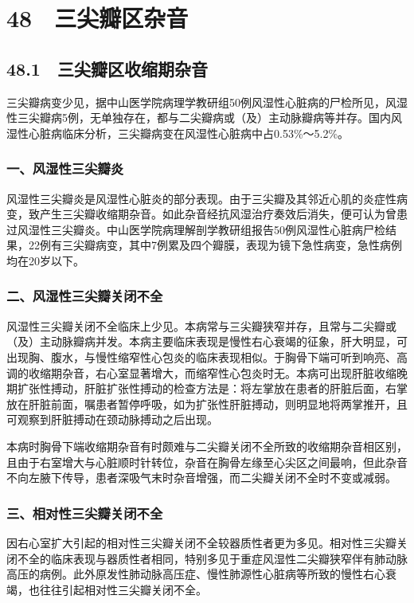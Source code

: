 \section{48　三尖瓣区杂音}

\subsection{48.1　三尖瓣区收缩期杂音}

三尖瓣病变少见，据中山医学院病理学教研组50例风湿性心脏病的尸检所见，风湿性三尖瓣病5例，无单独存在，都与二尖瓣病或（及）主动脉瓣病等并存。国内风湿性心脏病临床分析，三尖瓣病变在风湿性心脏病中占0.53\%～5.2\%。

\subsubsection{一、风湿性三尖瓣炎}

风湿性三尖瓣炎是风湿性心脏炎的部分表现。由于三尖瓣及其邻近心肌的炎症性病变，致产生三尖瓣收缩期杂音。如此杂音经抗风湿治疗奏效后消失，便可认为曾患过风湿性三尖瓣炎。中山医学院病理解剖学教研组报告50例风湿性心脏病尸检结果，22例有三尖瓣病变，其中7例累及四个瓣膜，表现为镜下急性病变，急性病例均在20岁以下。

\subsubsection{二、风湿性三尖瓣关闭不全}

风湿性三尖瓣关闭不全临床上少见。本病常与三尖瓣狭窄并存，且常与二尖瓣或（及）主动脉瓣病并发。本病主要临床表现是慢性右心衰竭的征象，肝大明显，可出现胸、腹水，与慢性缩窄性心包炎的临床表现相似。于胸骨下端可听到响亮、高调的收缩期杂音，右心室显著增大，而缩窄性心包炎时无。本病可出现肝脏收缩晚期扩张性搏动，肝脏扩张性搏动的检查方法是：将左掌放在患者的肝脏后面，右掌放在肝脏前面，嘱患者暂停呼吸，如为扩张性肝脏搏动，则明显地将两掌推开，且可观察到肝脏搏动在颈动脉搏动之后出现。

本病时胸骨下端收缩期杂音有时颇难与二尖瓣关闭不全所致的收缩期杂音相区别，且由于右室增大与心脏顺时针转位，杂音在胸骨左缘至心尖区之间最响，但此杂音不向左腋下传导，患者深吸气末时杂音增强，而二尖瓣关闭不全时不变或减弱。

\subsubsection{三、相对性三尖瓣关闭不全}

因右心室扩大引起的相对性三尖瓣关闭不全较器质性者更为多见。相对性三尖瓣关闭不全的临床表现与器质性者相同，特别多见于重症风湿性二尖瓣狭窄伴有肺动脉高压的病例。此外原发性肺动脉高压症、慢性肺源性心脏病等所致的慢性右心衰竭，也往往引起相对性三尖瓣关闭不全。

